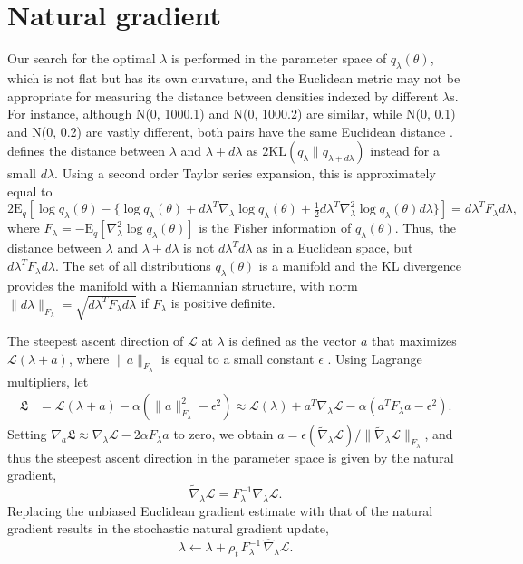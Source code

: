 \documentclass{statsoc}
\newcommand\E{{\text{E}}}
\newcommand\mL{{\mathcal{L}}}
\newcommand\KL{\text{KL}}
\begin{document}
\section{Natural gradient} \label{sec_natgrad}
Our search for the optimal $\lambda$ is performed in the parameter space of $q_\lambda(\theta)$, which is not flat but has its own curvature, and the Euclidean metric may not be appropriate for measuring the distance between densities indexed by different $\lambda$s. For instance, although N(0, 1000.1) and N(0, 1000.2) are similar, while N(0, 0.1) and N(0, 0.2) are vastly different, both pairs have the same Euclidean distance \citep{Salimbeni2018}. \cite{Amari2016} defines the distance between $\lambda$ and $\lambda +d\lambda$ as $2\KL(q_\lambda \| q_{\lambda + d\lambda})$ instead for a small $d\lambda$. Using a second order Taylor series expansion, this is approximately equal to 
\[
2\E_q \left[ \log q_\lambda(\theta) - \{ \log q_\lambda(\theta) + d\lambda^T  \nabla_\lambda \log q_\lambda(\theta) + \tfrac{1}{2} d\lambda^T  \nabla_\lambda^2 \log q_\lambda (\theta) d\lambda \} \right] 
= d\lambda^T  F_\lambda d\lambda,
\]
where $F_\lambda= -\E_q [\nabla_\lambda^2 \log q_\lambda (\theta)]$ is the Fisher information of $q_\lambda(\theta)$. Thus, the distance between $\lambda$ and $\lambda + d\lambda$ is not $d\lambda^T  d\lambda$ as in a Euclidean space, but $d\lambda^T  F_\lambda d\lambda$. The set of all distributions $q_\lambda(\theta)$ is a manifold and the KL divergence provides the manifold with a Riemannian structure, with norm $\| d\lambda \|_{F_\lambda} = \sqrt{d\lambda^T  F_\lambda d\lambda}$ if $F_\lambda$ is positive definite.

The steepest ascent direction of $\mL$ at $\lambda$ is defined as the vector $a$ that maximizes $\mL(\lambda + a)$, where $\|a\|_{F_\lambda}$ is equal to a small constant $\epsilon$ \citep{Amari1998}. Using Lagrange multipliers, let
\[
\begin{aligned}
\mathfrak{L} &= \mL(\lambda + a) - \alpha (\|a\|^2_{F_\lambda} - \epsilon^2) 
\approx \mL(\lambda) +  a^T  \nabla_\lambda \mL - \alpha (a^T  F_\lambda a -\epsilon^2).
\end{aligned}
\]
Setting $\nabla_{a} \mathfrak{L}  \approx \nabla_\lambda \mL - 2\alpha F_\lambda a$ to zero, we obtain $a = \epsilon (\widetilde{\nabla}_\lambda \mL)/ \|\widetilde{\nabla}_\lambda \mL \|_{F_\lambda}$, and thus the steepest ascent direction in the parameter space is given by the natural gradient, 
\[
\widetilde{\nabla}_\lambda \mL = F_\lambda ^{-1} \nabla_\lambda \mL.
\]
Replacing the unbiased Euclidean gradient estimate with that of the natural gradient results in the stochastic natural gradient update,
\[
\lambda \leftarrow \lambda + \rho_t \, F_{\lambda}^{-1} \,\widehat{\nabla}_{\lambda} \mL.
\]
\end{document}
